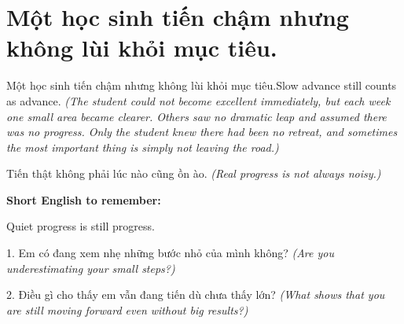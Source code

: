 \section{Một học sinh tiến chậm nhưng không lùi khỏi mục tiêu.}
\begin{truyen}{Một học sinh tiến chậm nhưng không lùi khỏi mục tiêu.}{Slow advance still counts as advance.}
\textit{(The student could not become excellent immediately, but each week one small area became clearer. Others saw no dramatic leap and assumed there was no progress. Only the student knew there had been no retreat, and sometimes the most important thing is simply not leaving the road.)}
\end{truyen}
\begin{baihoc}
Tiến thật không phải lúc nào cũng ồn ào.
\textit{(Real progress is not always noisy.)}
\end{baihoc}
\begin{ghinhoanh}
\textbf{Short English to remember:}

Quiet progress is still progress.
\end{ghinhoanh}
\begin{tuhocnhanh}
1. Em có đang xem nhẹ những bước nhỏ của mình không? \textit{(Are you underestimating your small steps?)}

2. Điều gì cho thấy em vẫn đang tiến dù chưa thấy lớn? \textit{(What shows that you are still moving forward even without big results?)}
\end{tuhocnhanh}
\ngancach

